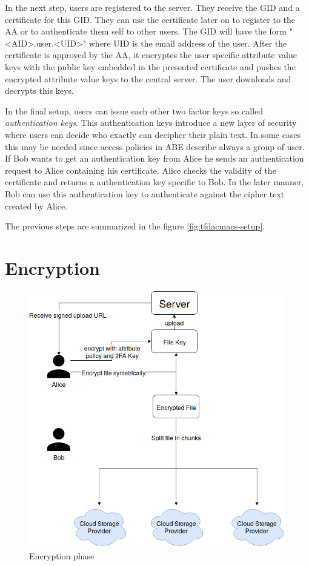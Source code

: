 In the next step, users are registered to the server. They receive the GID and a certificate for this GID. They can use the certificate later on to register to the AA or to authenticate them self to other users. The GID will have the form "<AID>.user.<UID>" where UID is the email address of the user. After the certificate is approved by the AA, it encryptes the user specific attribute value keys with the public key embedded in the presented certificate and pushes the encrypted attribute value keys to the central server. The user downloads and decrypts this keys. 

In the final setup, users can issue each other two factor keys so called \textit{authentication keys}. This authentication keys introduce a new layer of security where users can decide who exactly can decipher their plain text. In some cases this may be needed since access policies in ABE describe always a group of user. 
If Bob wants to get an authentication key from Alice he sends an authentication request to Alice containing his certificate. Alice checks the validity of the certificate and returns a authentication key specific to Bob. In the later manner, Bob can use this authentication key to authenticate against the cipher text created by Alice. 

The previous steps are summarized in the figure \ref{fig:tfdacmacs-setup}.

\section{Encryption}
\begin{figure}[!t]
\centering
    \includegraphics[width=0.7\linewidth]{img/TF-DAC-MACS-overview-encrypt.png}
    \caption{Encryption phase}
    \label{fig:tfdacmacs-encrypt}
\end{figure}

